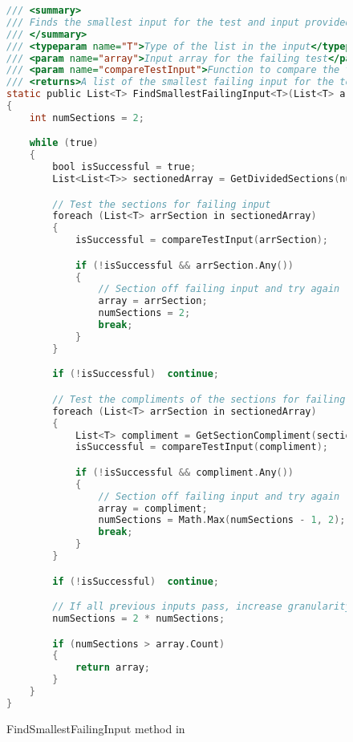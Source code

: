 \clearpage %

\label{FindSmallestInput Method}


\begin{figure}
\begin{lstlisting}[language=C]
/// <summary>
/// Finds the smallest input for the test and input provided for the test to continue to fail
/// </summary>
/// <typeparam name="T">Type of the list in the input</typeparam>
/// <param name="array">Input array for the failing test</param>
/// <param name="compareTestInput">Function to compare the test input against</param>
/// <returns>A list of the smallest failing input for the test to continue to fail</returns>
static public List<T> FindSmallestFailingInput<T>(List<T> array, Func<List<T>, bool> compareTestInput)
{
	int numSections = 2;

	while (true)
	{
		bool isSuccessful = true;
		List<List<T>> sectionedArray = GetDividedSections(numSections, array);

		// Test the sections for failing input
		foreach (List<T> arrSection in sectionedArray)
		{
			isSuccessful = compareTestInput(arrSection);

			if (!isSuccessful && arrSection.Any())
			{
				// Section off failing input and try again
				array = arrSection;
				numSections = 2;
				break;
			}
		}

		if (!isSuccessful)	continue;

		// Test the compliments of the sections for failing input
		foreach (List<T> arrSection in sectionedArray)
		{
			List<T> compliment = GetSectionCompliment(sectionedArray, sectionedArray.IndexOf(arrSection));
			isSuccessful = compareTestInput(compliment);

			if (!isSuccessful && compliment.Any())
			{
				// Section off failing input and try again
				array = compliment;
				numSections = Math.Max(numSections - 1, 2);
				break;
			}
		}

		if (!isSuccessful)	continue;

		// If all previous inputs pass, increase granularity, create more equal parts
		numSections = 2 * numSections;

		if (numSections > array.Count)
		{
			return array;
		}
	}
}

\end{lstlisting}
\caption{FindSmallestFailingInput method in \mytool}
\label{fig:findSmallestFailingInput1}
\end{figure}
